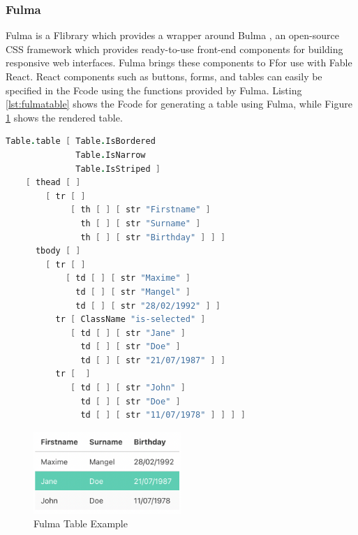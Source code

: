 \subsubsection{Fulma}
Fulma \cite{fulmaio} is a F\fsharp library which provides a wrapper around Bulma \cite{bulmaio}, an open-source CSS framework which provides ready-to-use front-end components for building responsive web interfaces. Fulma brings these components to F\fsharp for use with Fable React. React components such as buttons, forms, and tables can easily be specified in the F\fsharp code using the functions provided by Fulma. Listing \ref{lst:fulmatable} shows the F\fsharp code for generating a table using Fulma, while Figure \ref{fig:fulmatable} shows the rendered table.

\begin{lstlisting}[language=FSharp, caption={Simple F\fsharp code for generating a table with Fulma \cite{fulmatable}}, captionpos=b, label={lst:fulmatable}]
    Table.table [ Table.IsBordered
              Table.IsNarrow
              Table.IsStriped ]
    [ thead [ ]
        [ tr [ ]
             [ th [ ] [ str "Firstname" ]
               th [ ] [ str "Surname" ]
               th [ ] [ str "Birthday" ] ] ]
      tbody [ ]
        [ tr [ ]
            [ td [ ] [ str "Maxime" ]
              td [ ] [ str "Mangel" ]
              td [ ] [ str "28/02/1992" ] ]
          tr [ ClassName "is-selected" ]
             [ td [ ] [ str "Jane" ]
               td [ ] [ str "Doe" ]
               td [ ] [ str "21/07/1987" ] ]
          tr [  ]
             [ td [ ] [ str "John" ]
               td [ ] [ str "Doe" ]
               td [ ] [ str "11/07/1978" ] ] ] ]
\end{lstlisting}

\begin{figure} [h]
    \centering
    \includegraphics[width=0.5\textwidth]{02.Background/Fulma Table.png}
    \caption{Fulma Table Example}
    \label{fig:fulmatable}
\end{figure}


